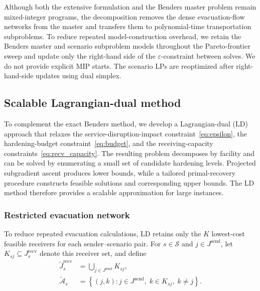 \documentclass[preprint,11pt,authoryear]{elsarticle}
\begin{document}
Although both the extensive formulation and the Benders master problem remain
mixed-integer programs, the decomposition removes the dense evacuation-flow
networks from the master and transfers them to polynomial-time transportation
subproblems. To reduce repeated model-construction overhead, we retain the Benders master and scenario subproblem models throughout the Pareto-frontier sweep and update
only the right-hand side of the $\varepsilon$-constraint between solves. We do not provide explicit MIP starts. The scenario LPs are reoptimized after right-hand-side updates using dual simplex.

\subsection{Scalable Lagrangian-dual method}
\label{sec:lagrangian_dual}

To complement the exact Benders method, we develop a Lagrangian-dual (LD)
approach that relaxes the
service-disruption-impact constraint~\eqref{eq:epsilon}, the hardening-budget constraint~\eqref{eq:budget}, and the receiving-capacity constraints~\eqref{eq:recv_capacity}. The resulting problem decomposes by facility and can be solved by enumerating a small set
of candidate hardening levels. Projected subgradient ascent produces lower
bounds, while a tailored primal-recovery
procedure constructs feasible solutions and corresponding upper bounds. The
LD method therefore provides a scalable approximation for large instances.

\subsubsection{Restricted evacuation network}
\label{sec:ld_restricted_network}

To reduce repeated evacuation calculations, LD retains only the $K$
lowest-cost feasible receivers for each sender--scenario pair. For
$s\in\mathcal S$ and $j\in J^{\mathrm{send}}$, let
$K_{sj}\subseteq J_s^{\mathrm{recv}}$ denote this receiver set, and define
\begin{align*}
\widetilde J_s^{\mathrm{recv}}
&=
\bigcup_{j\in J^{\mathrm{send}}}K_{sj},
\\
\widetilde{\mathcal A}_s
&=
\left\{
(j,k):
j\in J^{\mathrm{send}},\;
k\in K_{sj},\;
k\neq j
\right\}.
\end{align*}
\end{document}
